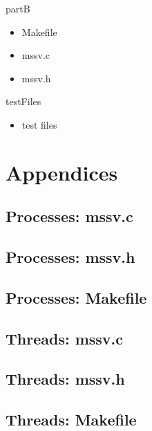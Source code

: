 \documentclass[]{article}
\begin{document}
partB
\begin{itemize}
	\item Makefile
	\item mssv.c
	\item mssv.h
\end{itemize}

testFiles
\begin{itemize}
	\item test files
\end{itemize}

\pagebreak



%
\nocite{*}
\printbibliography
%
\pagebreak
\section{Appendices}
\subsection{Processes: mssv.c}

\pagebreak
\subsection{Processes: mssv.h}

\pagebreak
\subsection{Processes: Makefile}

\pagebreak
\subsection{Threads: mssv.c}

\pagebreak
\subsection{Threads: mssv.h}

\pagebreak
\subsection{Threads: Makefile}

\end{document}
